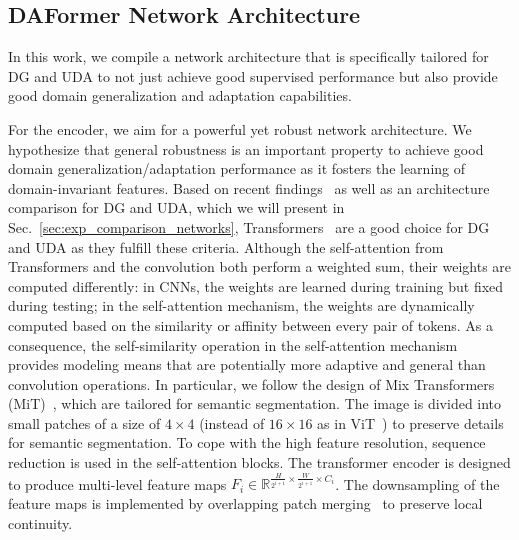 \documentclass[journal,compsoc]{IEEEtran}
\begin{document}
\subsection{DAFormer Network Architecture}
\label{sec:methods_architecture}

In this work, we compile a network architecture that is specifically tailored for DG and UDA to not just achieve good supervised performance but also provide good domain generalization and adaptation capabilities.

For the encoder, we aim for a powerful yet robust network architecture. 
We hypothesize that general robustness is an important property to achieve good domain generalization/adaptation performance as it fosters the learning of domain-invariant features.
Based on recent findings~\cite{bhojanapalli2021understanding, naseer2021intriguing} as well as an architecture comparison for DG and UDA, which we will present in Sec.~\ref{sec:exp_comparison_networks}, Transformers~\cite{vaswani2017attention} are a good choice for DG and UDA as they fulfill these criteria. Although the self-attention from Transformers and the convolution both perform a weighted sum, their weights are computed differently: in CNNs, the weights are learned during training but fixed during testing; in the self-attention mechanism, the weights are dynamically computed based on the similarity or affinity between every pair of tokens. As a consequence, the self-similarity operation in the self-attention mechanism provides modeling means that are potentially more adaptive and general than convolution operations.
In particular, we follow the design of Mix Transformers (MiT)~\cite{xie2021segformer}, which are tailored for semantic segmentation. The image is divided into small patches of a size of $4{\times}4$  (instead of $16{\times}16$ as in ViT~\cite{dosovitskiy2020image}) to preserve details for semantic segmentation. To cope with the high feature resolution, sequence reduction is used in the self-attention blocks. The transformer encoder is designed to produce multi-level feature maps $F_i \in \mathbb{R}^{\frac{H}{2^{i+1}} \times \frac{W}{2^{i+1}} \times C_i}$. The downsampling of the feature maps is implemented by overlapping patch merging~\cite{xie2021segformer} to preserve local continuity.
\end{document}
